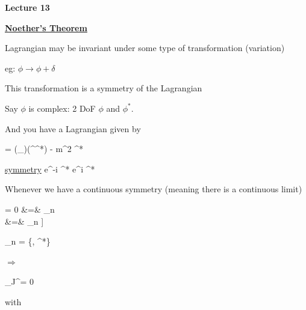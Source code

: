 



\thispagestyle{fancy}

\begin{center}
{\huge \textbf{Lecture 13}}
\end{center}

{\fontsize{14}{16}\selectfont

\textbf{\underline{Noether's Theorem}} 

Lagrangian may be invariant under some type of transformation (variation) 

eg: $\phi \rightarrow \phi + \delta$

This transformation is a symmetry of the Lagrangian

Say $\phi$ is complex:  2 DoF  $\phi$ and $\phi^*$.

And you have a Lagrangian given by


\be
{} = (\partial_\mu \phi)(\partial^\mu \phi^*) - m^2 \phi \phi^*
\ee

\underline{symmetry}
\be
\phi \rightarrow e^{-i\alpha} \phi \hspace{1in} \phi^* \rightarrow e^{i\alpha} \phi^*
\ee


Whenever we have a continuous symmetry (meaning there is a continuous limit)

\bea
{} = 0 &=& \sum_n   \\ 
&=& \sum_n \left[ \underbrace{\left[ \frac{\partial \mathcal{L}}{\partial \phi_n} - \partial_\mu \frac{\partial \mathcal{L}}{\partial (\partial_\mu \phi_n)} \right]}_{=0\ \textrm{Euler Lagrange}} \frac{\delta \phi_n}{\delta \alpha}  +  \partial_\mu \left[ \frac{\partial \mathcal{L}}{\partial (\partial_\mu \phi_n)} \frac{\delta \phi_n}{\delta \alpha} \right] \right]
\eea

\be
\phi_n = \{\phi, \phi^*\}
\ee

$\Rightarrow$

\be
\partial_\mu J^\mu = 0
\ee

with 

}
